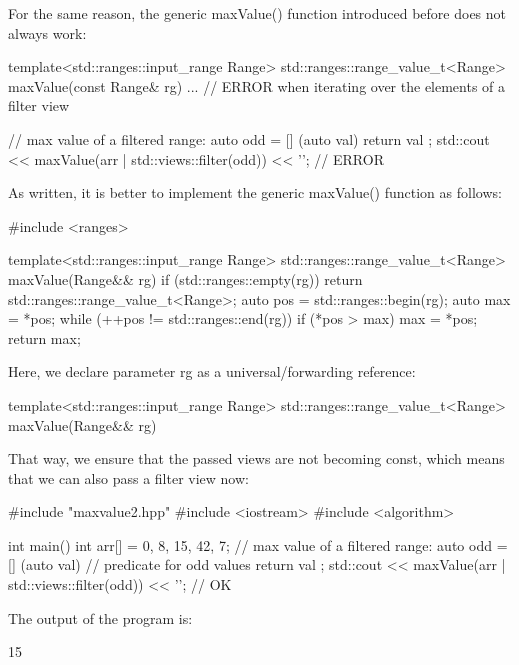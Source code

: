 For the same reason, the generic maxValue() function introduced before does not always work:

\begin{cpp}
template<std::ranges::input_range Range>
std::ranges::range_value_t<Range> maxValue(const Range& rg)
{
	... // ERROR when iterating over the elements of a filter view
}

// max value of a filtered range:
auto odd = [] (auto val) {
					return val %
				};
std::cout << maxValue(arr | std::views::filter(odd)) << '\n'; // ERROR
\end{cpp}

As written, it is better to implement the generic maxValue() function as follows:


\begin{cpp}
#include <ranges>

template<std::ranges::input_range Range>
std::ranges::range_value_t<Range> maxValue(Range&& rg)
{
	if (std::ranges::empty(rg)) {
		return std::ranges::range_value_t<Range>{};
	}
	auto pos = std::ranges::begin(rg);
	auto max = *pos;
	while (++pos != std::ranges::end(rg)) {
		if (*pos > max) {
			max = *pos;
		}
	}
	return max;
}
\end{cpp}

Here, we declare parameter rg as a universal/forwarding reference:

\begin{cpp}
template<std::ranges::input_range Range>
std::ranges::range_value_t<Range> maxValue(Range&& rg)
\end{cpp}

That way, we ensure that the passed views are not becoming const, which means that we can also pass a filter view now:


\begin{cpp}
#include "maxvalue2.hpp"
#include <iostream>
#include <algorithm>

int main()
{
	int arr[] = {0, 8, 15, 42, 7};
	// max value of a filtered range:
	auto odd = [] (auto val) { // predicate for odd values
				return val %
			};
	std::cout << maxValue(arr | std::views::filter(odd)) << '\n'; // OK
}
\end{cpp}

The output of the program is:

\begin{shell}
15
\end{shell}

